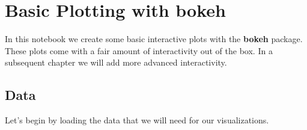 \documentclass[
  letterpaper,
  DIV=11,
  numbers=noendperiod]{scrreprt}
\begin{document}
\hypertarget{basic-plotting-with-bokeh}{%
\chapter{\texorpdfstring{Basic Plotting with
\textbf{bokeh}}{Basic Plotting with bokeh}}\label{basic-plotting-with-bokeh}}

In this notebook we create some basic interactive plots with the
\textbf{bokeh} package. These plots come with a fair amount of
interactivity out of the box. In a subsequent chapter we will add more
advanced interactivity.

\hypertarget{data}{%
\section{Data}\label{data}}

Let's begin by loading the data that we will need for our
visualizations.
\end{document}
